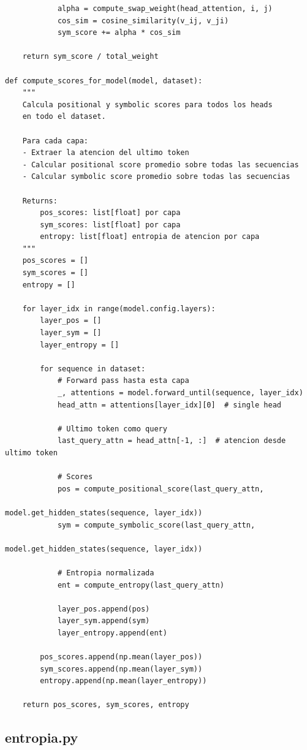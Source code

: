 \documentclass[12pt,a4paper]{report}
\begin{document}
\begin{lstlisting}
            alpha = compute_swap_weight(head_attention, i, j)
            cos_sim = cosine_similarity(v_ij, v_ji)
            sym_score += alpha * cos_sim
    
    return sym_score / total_weight

def compute_scores_for_model(model, dataset):
    """
    Calcula positional y symbolic scores para todos los heads
    en todo el dataset.
    
    Para cada capa:
    - Extraer la atencion del ultimo token
    - Calcular positional score promedio sobre todas las secuencias
    - Calcular symbolic score promedio sobre todas las secuencias
    
    Returns:
        pos_scores: list[float] por capa
        sym_scores: list[float] por capa
        entropy: list[float] entropia de atencion por capa
    """
    pos_scores = []
    sym_scores = []
    entropy = []
    
    for layer_idx in range(model.config.layers):
        layer_pos = []
        layer_sym = []
        layer_entropy = []
        
        for sequence in dataset:
            # Forward pass hasta esta capa
            _, attentions = model.forward_until(sequence, layer_idx)
            head_attn = attentions[layer_idx][0]  # single head
            
            # Ultimo token como query
            last_query_attn = head_attn[-1, :]  # atencion desde ultimo token
            
            # Scores
            pos = compute_positional_score(last_query_attn, 
                                           model.get_hidden_states(sequence, layer_idx))
            sym = compute_symbolic_score(last_query_attn,
                                          model.get_hidden_states(sequence, layer_idx))
            
            # Entropia normalizada
            ent = compute_entropy(last_query_attn)
            
            layer_pos.append(pos)
            layer_sym.append(sym)
            layer_entropy.append(ent)
        
        pos_scores.append(np.mean(layer_pos))
        sym_scores.append(np.mean(layer_sym))
        entropy.append(np.mean(layer_entropy))
    
    return pos_scores, sym_scores, entropy
\end{lstlisting}

\subsection{entropia.py}
\label{subsec:entropia}
\end{document}

